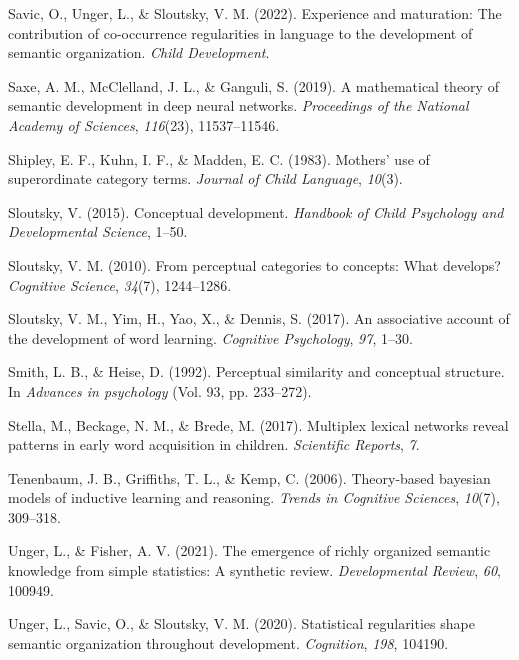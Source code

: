 \documentclass[english,,man]{apa6}
\begin{document}
\leavevmode\hypertarget{ref-savic2022experience}{}%
Savic, O., Unger, L., \& Sloutsky, V. M. (2022). Experience and maturation: The contribution of co-occurrence regularities in language to the development of semantic organization. \emph{Child Development}.

\leavevmode\hypertarget{ref-saxe2019mathematical}{}%
Saxe, A. M., McClelland, J. L., \& Ganguli, S. (2019). A mathematical theory of semantic development in deep neural networks. \emph{Proceedings of the National Academy of Sciences}, \emph{116}(23), 11537--11546.

\leavevmode\hypertarget{ref-shipley1983}{}%
Shipley, E. F., Kuhn, I. F., \& Madden, E. C. (1983). Mothers' use of superordinate category terms. \emph{Journal of Child Language}, \emph{10}(3).

\leavevmode\hypertarget{ref-sloutsky2015}{}%
Sloutsky, V. (2015). Conceptual development. \emph{Handbook of Child Psychology and Developmental Science}, 1--50.

\leavevmode\hypertarget{ref-sloutsky2010}{}%
Sloutsky, V. M. (2010). From perceptual categories to concepts: What develops? \emph{Cognitive Science}, \emph{34}(7), 1244--1286.

\leavevmode\hypertarget{ref-sloutsky2017}{}%
Sloutsky, V. M., Yim, H., Yao, X., \& Dennis, S. (2017). An associative account of the development of word learning. \emph{Cognitive Psychology}, \emph{97}, 1--30.

\leavevmode\hypertarget{ref-smith1992}{}%
Smith, L. B., \& Heise, D. (1992). Perceptual similarity and conceptual structure. In \emph{Advances in psychology} (Vol. 93, pp. 233--272).

\leavevmode\hypertarget{ref-stella2017}{}%
Stella, M., Beckage, N. M., \& Brede, M. (2017). Multiplex lexical networks reveal patterns in early word acquisition in children. \emph{Scientific Reports}, \emph{7}.

\leavevmode\hypertarget{ref-tenenbaum2006theory}{}%
Tenenbaum, J. B., Griffiths, T. L., \& Kemp, C. (2006). Theory-based bayesian models of inductive learning and reasoning. \emph{Trends in Cognitive Sciences}, \emph{10}(7), 309--318.

\leavevmode\hypertarget{ref-unger2021}{}%
Unger, L., \& Fisher, A. V. (2021). The emergence of richly organized semantic knowledge from simple statistics: A synthetic review. \emph{Developmental Review}, \emph{60}, 100949.

\leavevmode\hypertarget{ref-unger2020statistical}{}%
Unger, L., Savic, O., \& Sloutsky, V. M. (2020). Statistical regularities shape semantic organization throughout development. \emph{Cognition}, \emph{198}, 104190.
\end{document}
